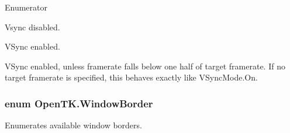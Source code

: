 \begin{Desc}
\item[Enumerator]\par
\begin{description}
\item[{\em 
\hypertarget{namespace_open_t_k_a1c0421cc4ecbb6d5e57317906fe8b8d3ad15305d7a4e34e02489c74a5ef542f36}{Off}\label{namespace_open_t_k_a1c0421cc4ecbb6d5e57317906fe8b8d3ad15305d7a4e34e02489c74a5ef542f36}
}]Vsync disabled. \item[{\em 
\hypertarget{namespace_open_t_k_a1c0421cc4ecbb6d5e57317906fe8b8d3a521c36a31c2762741cf0f8890cbe05e3}{On}\label{namespace_open_t_k_a1c0421cc4ecbb6d5e57317906fe8b8d3a521c36a31c2762741cf0f8890cbe05e3}
}]V\-Sync enabled. \item[{\em 
\hypertarget{namespace_open_t_k_a1c0421cc4ecbb6d5e57317906fe8b8d3a1244cba6ca79bfda45de46141d32ea7b}{Adaptive}\label{namespace_open_t_k_a1c0421cc4ecbb6d5e57317906fe8b8d3a1244cba6ca79bfda45de46141d32ea7b}
}]V\-Sync enabled, unless framerate falls below one half of target framerate. If no target framerate is specified, this behaves exactly like V\-Sync\-Mode.\-On. \end{description}
\end{Desc}
\hypertarget{namespace_open_t_k_a20f46792b5471ff32362bd0a29fa5f1c}{
\subsubsection[{Window\-Border}]{\setlength{\rightskip}{0pt plus 5cm}enum {\bf Open\-T\-K.\-Window\-Border}}}\label{namespace_open_t_k_a20f46792b5471ff32362bd0a29fa5f1c}


Enumerates available window borders. 

